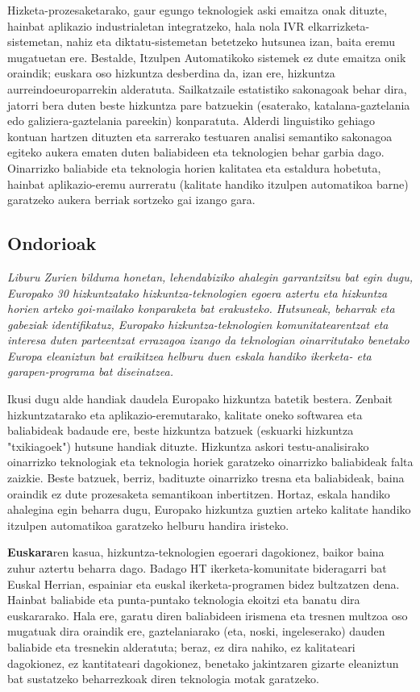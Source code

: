 \begin{multicols}{2}
    Hizketa-prozesaketarako, gaur egungo teknologiek aski emaitza onak dituzte, hainbat aplikazio industrialetan integratzeko, hala nola IVR elkarrizketa-sistemetan, nahiz eta diktatu-sistemetan betetzeko hutsunea izan, baita eremu mugatuetan ere. Bestalde, Itzulpen Automatikoko sistemek ez dute emaitza onik oraindik; euskara oso hizkuntza desberdina da, izan ere, hizkuntza aurreindoeuroparrekin alderatuta. Sailkatzaile estatistiko sakonagoak behar dira, jatorri bera duten beste hizkuntza pare batzuekin (esaterako, katalana-gaztelania edo galiziera-gaztelania pareekin) konparatuta. Alderdi linguistiko gehiago kontuan hartzen dituzten eta sarrerako testuaren analisi semantiko sakonagoa egiteko aukera ematen duten baliabideen eta teknologien behar garbia dago. Oinarrizko baliabide eta teknologia horien kalitatea eta estaldura hobetuta, hainbat aplikazio-eremu aurreratu (kalitate handiko itzulpen automatikoa barne) garatzeko aukera berriak sortzeko gai izango gara.

\subsection{Ondorioak}

\emph{   Liburu Zurien bilduma honetan, lehendabiziko ahalegin garrantzitsu bat egin dugu, Europako 30 hizkuntzatako hizkuntza-teknologien egoera aztertu eta hizkuntza horien arteko goi-mailako konparaketa bat erakusteko. Hutsuneak, beharrak eta gabeziak identifikatuz, Europako hizkuntza-teknologien komunitatearentzat eta interesa duten parteentzat errazagoa izango da teknologian oinarritutako benetako Europa eleaniztun bat eraikitzea helburu duen eskala handiko ikerketa- eta garapen-programa bat diseinatzea.}

    Ikusi dugu alde handiak daudela Europako hizkuntza batetik bestera. Zenbait hizkuntzatarako eta aplikazio-eremutarako, kalitate oneko softwarea eta baliabideak badaude ere, beste hizkuntza batzuek (eskuarki hizkuntza "txikiagoek") hutsune handiak dituzte. Hizkuntza askori testu-analisirako oinarrizko teknologiak eta teknologia horiek garatzeko oinarrizko baliabideak falta zaizkie. Beste batzuek, berriz, badituzte oinarrizko tresna eta baliabideak, baina oraindik ez dute prozesaketa semantikoan inbertitzen. Hortaz, eskala handiko ahalegina egin beharra dugu, Europako hizkuntza guztien arteko kalitate handiko itzulpen automatikoa garatzeko helburu handira iristeko.

   \textbf{ Euskara}ren kasua, hizkuntza-teknologien egoerari dagokionez, baikor baina zuhur aztertu beharra dago. Badago HT ikerketa-komunitate bideragarri bat Euskal Herrian, espainiar eta euskal ikerketa-programen bidez bultzatzen dena. Hainbat baliabide eta punta-puntako teknologia ekoitzi eta banatu dira euskararako. Hala ere, garatu diren baliabideen irismena eta tresnen multzoa oso mugatuak dira oraindik ere, gaztelaniarako (eta, noski, ingeleserako) dauden baliabide eta tresnekin alderatuta; beraz, ez dira nahiko, ez kalitateari dagokionez, ez kantitateari dagokionez, benetako jakintzaren gizarte eleaniztun bat sustatzeko beharrezkoak diren teknologia motak garatzeko.


\end{multicols}
